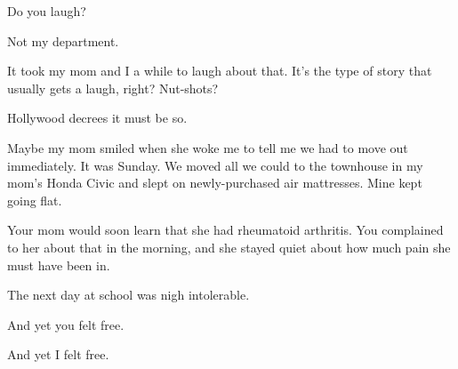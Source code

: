 Do you laugh?

\begin{ally}
Not my department.
\end{ally}
It took my mom and I a while to laugh about that. It's the type of story that usually gets a laugh, right? Nut-shots?

\begin{ally}
Hollywood decrees it must be so.
\end{ally}
Maybe my mom smiled when she woke me to tell me we had to move out immediately. It was Sunday. We moved all we could to the townhouse in my mom's Honda Civic and slept on newly-purchased air mattresses. Mine kept going flat.

\begin{ally}
Your mom would soon learn that she had rheumatoid arthritis. You complained to her about that in the morning, and she stayed quiet about how much pain she must have been in.
\end{ally}
The next day at school was nigh intolerable.

\begin{ally}
And yet you felt free.
\end{ally}
And yet I felt free.
\newpage
